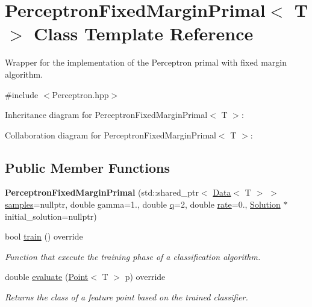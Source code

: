 \hypertarget{class_perceptron_fixed_margin_primal}{}\section{Perceptron\+Fixed\+Margin\+Primal$<$ T $>$ Class Template Reference}
\label{class_perceptron_fixed_margin_primal}


Wrapper for the implementation of the Perceptron primal with fixed margin algorithm.  




{\ttfamily \#include $<$Perceptron.\+hpp$>$}



Inheritance diagram for Perceptron\+Fixed\+Margin\+Primal$<$ T $>$\+:


Collaboration diagram for Perceptron\+Fixed\+Margin\+Primal$<$ T $>$\+:
\subsection*{Public Member Functions}
\begin{DoxyCompactItemize}
\item 
\mbox{\label{class_perceptron_fixed_margin_primal_ac0352938dd986cda1b44c45040a2d46f}} 
{\bfseries Perceptron\+Fixed\+Margin\+Primal} (std\+::shared\+\_\+ptr$<$ \mbox{\hyperlink{class_data}{Data}}$<$ T $>$ $>$ \mbox{\hyperlink{class_classifier_a0000b47a2e0784ada4c52d7046c4adb8}{samples}}=nullptr, double gamma=1., double \mbox{\hyperlink{class_primal_classifier_ae30c00c25bce4b1623baa54b5e2812b4}{q}}=2, double \mbox{\hyperlink{class_classifier_a7b1c4ef87631bd9e46682e5bc4315111}{rate}}=0., \mbox{\hyperlink{class_solution}{Solution}} $\ast$initial\+\_\+solution=nullptr)
\item 
bool \mbox{\hyperlink{class_perceptron_fixed_margin_primal_a6d4a14b9f39a4fef45de201edfeabce0}{train}} () override
\begin{DoxyCompactList}\small\item\em Function that execute the training phase of a classification algorithm. \end{DoxyCompactList}\item 
double \mbox{\hyperlink{class_perceptron_fixed_margin_primal_a5bfe0f03533361017b594c3fe67f0905}{evaluate}} (\mbox{\hyperlink{class_point}{Point}}$<$ T $>$ p) override
\begin{DoxyCompactList}\small\item\em Returns the class of a feature point based on the trained classifier. \end{DoxyCompactList}\end{DoxyCompactItemize}

